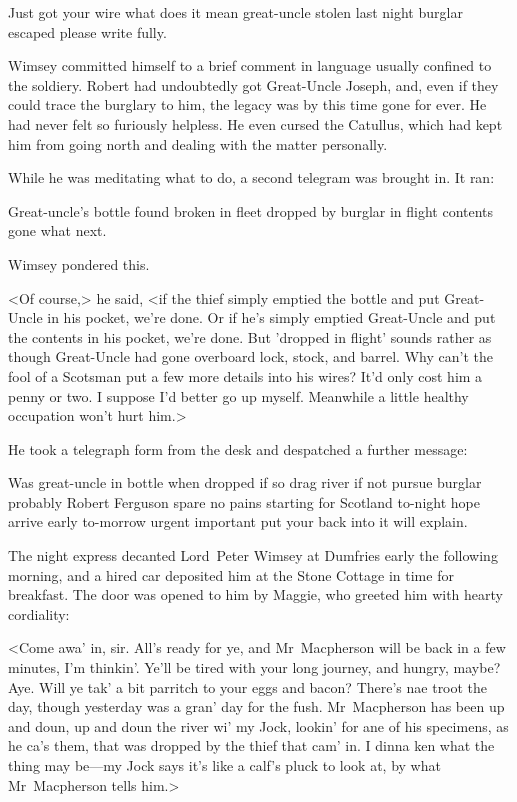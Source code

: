 \begin{telegram}
Just got your wire what does it mean great-uncle stolen last night burglar escaped please write fully.
\end{telegram}

Wimsey committed himself to a brief comment in language usually confined to the soldiery. Robert had undoubtedly got Great-Uncle Joseph, and, even if they could trace the burglary to him, the legacy was by this time gone for ever. He had never felt so furiously helpless. He even cursed the Catullus, which had kept him from going north and dealing with the matter personally.

While he was meditating what to do, a second telegram was brought in. It ran:

\begin{telegram}
Great-uncle's bottle found broken in fleet dropped by burglar in flight contents gone what next.
\end{telegram}

Wimsey pondered this.

<Of course,> he said, <if the thief simply emptied the bottle and put Great-Uncle in his pocket, we're done. Or if he's simply emptied Great-Uncle and put the contents in his pocket, we're done. But 'dropped in flight' sounds rather as though Great-Uncle had gone overboard lock, stock, and barrel. Why can't the fool of a Scotsman put a few more details into his wires? It'd only cost him a penny or two. I suppose I'd better go up myself. Meanwhile a little healthy occupation won't hurt him.>

He took a telegraph form from the desk and despatched a further message:

\begin{telegram}
Was great-uncle in bottle when dropped if so drag river if not pursue burglar probably Robert Ferguson spare no pains starting for Scotland to-night hope arrive early to-morrow urgent important put your back into it will explain.
\end{telegram}

The night express decanted Lord~Peter Wimsey at Dumfries early the following morning, and a hired car deposited him at the Stone Cottage in time for breakfast. The door was opened to him by Maggie, who greeted him with hearty cordiality:

<Come awa' in, sir. All's ready for ye, and Mr~Macpherson will be back in a few minutes, I'm thinkin'. Ye'll be tired with your long journey, and hungry, maybe? Aye. Will ye tak' a bit parritch to your eggs and bacon? There's nae troot the day, though yesterday was a gran' day for the fush. Mr~Macpherson has been up and doun, up and doun the river wi' my Jock, lookin' for ane of his specimens, as he ca's them, that was dropped by the thief that cam' in. I dinna ken what the thing may be—my Jock says it's like a calf's pluck to look at, by what Mr~Macpherson tells him.>

